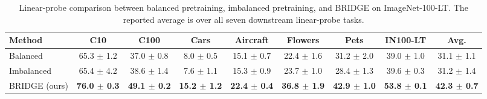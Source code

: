 \begin{table}[t]
\centering
\tiny
\setlength{\tabcolsep}{3.0pt}
\caption{Linear-probe comparison between balanced pretraining, imbalanced pretraining, and BRIDGE on ImageNet-100-LT. The reported average is over all seven downstream linear-probe tasks.}
\label{tab:main_baselines_linear}
\begin{adjustbox}{max width=\textwidth}
\begin{tabular}{l c c c c c c c c}
\toprule
Method & C10 & C100 & Cars & Aircraft & Flowers & Pets & IN100-LT & Avg. \\
\midrule
Balanced & 65.3 {\scriptsize$\pm$ 1.2} & 37.0 {\scriptsize$\pm$ 0.8} & 8.0 {\scriptsize$\pm$ 0.5} & 15.1 {\scriptsize$\pm$ 0.7} & 22.4 {\scriptsize$\pm$ 1.6} & 31.2 {\scriptsize$\pm$ 2.0} & 39.0 {\scriptsize$\pm$ 1.0} & 31.1 {\scriptsize$\pm$ 1.1} \\
Imbalanced & 65.4 {\scriptsize$\pm$ 4.2} & 38.6 {\scriptsize$\pm$ 1.4} & 7.6 {\scriptsize$\pm$ 1.1} & 15.3 {\scriptsize$\pm$ 0.9} & 23.7 {\scriptsize$\pm$ 1.0} & 28.4 {\scriptsize$\pm$ 1.3} & 39.6 {\scriptsize$\pm$ 0.3} & 31.2 {\scriptsize$\pm$ 1.4} \\
BRIDGE (ours) & \textbf{76.0 {\scriptsize$\pm$ 0.3}} & \textbf{49.1 {\scriptsize$\pm$ 0.2}} & \textbf{15.2 {\scriptsize$\pm$ 1.2}} & \textbf{22.4 {\scriptsize$\pm$ 0.4}} & \textbf{36.8 {\scriptsize$\pm$ 1.9}} & \textbf{42.9 {\scriptsize$\pm$ 1.0}} & \textbf{53.8 {\scriptsize$\pm$ 0.1}} & \textbf{42.3 {\scriptsize$\pm$ 0.7}} \\
\bottomrule
\end{tabular}
\end{adjustbox}
\end{table}

